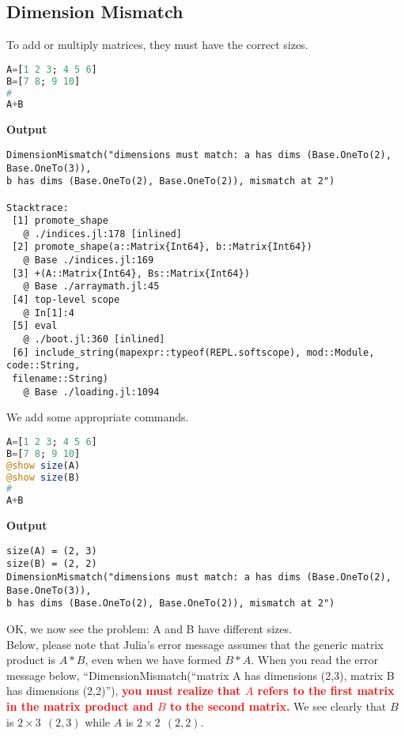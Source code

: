 \subsection{Dimension Mismatch}
To add or multiply matrices, they must have the correct sizes.

\begin{lstlisting}[language=Julia,style=mystyle]
A=[1 2 3; 4 5 6]
B=[7 8; 9 10]
#
A+B
\end{lstlisting}
\textbf{Output} 
\begin{verbatim}
DimensionMismatch("dimensions must match: a has dims (Base.OneTo(2), Base.OneTo(3)), 
b has dims (Base.OneTo(2), Base.OneTo(2)), mismatch at 2")

Stacktrace:
 [1] promote_shape
   @ ./indices.jl:178 [inlined]
 [2] promote_shape(a::Matrix{Int64}, b::Matrix{Int64})
   @ Base ./indices.jl:169
 [3] +(A::Matrix{Int64}, Bs::Matrix{Int64})
   @ Base ./arraymath.jl:45
 [4] top-level scope
   @ In[1]:4
 [5] eval
   @ ./boot.jl:360 [inlined]
 [6] include_string(mapexpr::typeof(REPL.softscope), mod::Module, code::String, 
 filename::String)
   @ Base ./loading.jl:1094
\end{verbatim}

We add some appropriate \texttt{\@show} commands. 

\begin{lstlisting}[language=Julia,style=mystyle]
A=[1 2 3; 4 5 6]
B=[7 8; 9 10]
@show size(A)
@show size(B)
#
A+B
\end{lstlisting}
\textbf{Output} 
\begin{verbatim}
size(A) = (2, 3)
size(B) = (2, 2)
DimensionMismatch("dimensions must match: a has dims (Base.OneTo(2), Base.OneTo(3)), 
b has dims (Base.OneTo(2), Base.OneTo(2)), mismatch at 2")
\end{verbatim}

OK, we now see the problem: A and B have different sizes. \\

Below, please note that Julia's error message assumes that the generic matrix product is $A * B$, even when we have formed $B*A$. When you read the error message below, ``DimensionMismatch(``matrix A has dimensions (2,3), matrix B has dimensions (2,2)''), \textcolor{red}{\bf you must realize that $A$ refers to the first matrix in the matrix product and $B$ to the second matrix.}  We see clearly that $B$ is $ 2 \times 3 ~~(2,3)$ while $A$ is $ 2 \times 2 ~~(2,2)$. 



